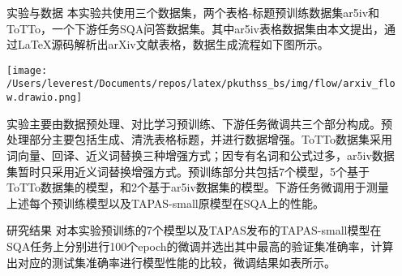 \documentclass[final,hyperref={pdfpagelabels=false}]{ctexbeamer}
\newcommand{\shrink}{-15pt}
\begin{document}
\begin{frame}[t]
\begin{columns}[t]

  \begin{column}{.02\textwidth}\end{column} %

  \begin{column}{.3\textwidth} %
    \vspace{\shrink}

    \begin{block}{实验与数据}
      本实验共使用三个数据集，两个表格-标题预训练数据集ar5iv和ToTTo，一个下游任务SQA问答数据集。其中ar5iv表格数据集由本文提出，通过LaTeX源码解析出arXiv文献表格，数据生成流程如下图所示。
      
      \vspace{4mm}
      \begin{center}
        \texttt{[image: /Users/leverest/Documents/repos/latex/pkuthss\_bs/img/flow/arxiv\_flow.drawio.png]}
      \end{center}
      \vspace{4mm}

      实验主要由数据预处理、对比学习预训练、下游任务微调共三个部分构成。预处理部分主要包括生成、清洗表格标题，并进行数据增强。ToTTo数据集采用词向量、回译、近义词替换三种增强方式；因专有名词和公式过多，ar5iv数据集暂时只采用近义词替换增强方式。预训练部分共包括7个模型，5个基于ToTTo数据集的模型，和2个基于ar5iv数据集的模型。下游任务微调用于测量上述每个预训练模型以及TAPAS-small原模型在SQA上的性能。
    \end{block}

    \begin{block}{研究结果}
      对本实验预训练的7个模型以及TAPAS发布的TAPAS-small模型在SQA任务上分别进行100个epoch的微调并选出其中最高的验证集准确率，计算出对应的测试集准确率进行模型性能的比较，微调结果如表所示。
      

\end{block}
\end{column}
\end{columns}
\end{frame}
\end{document}
